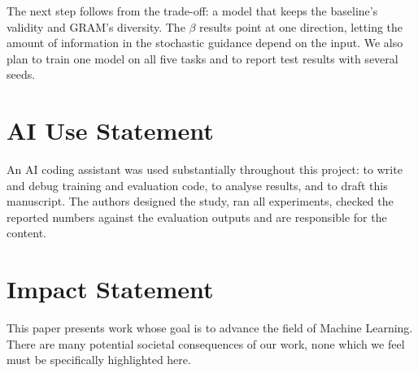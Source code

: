 \documentclass{article}
\begin{document}
The next step follows from the trade-off: a model that keeps the baseline's validity and GRAM's diversity. The
$\beta$ results point at one direction, letting the amount of information in the stochastic guidance depend on the
input. We also plan to train one model on all five tasks and to report test results with several seeds.

\section*{AI Use Statement}

An AI coding assistant was used substantially throughout this project: to write and debug training and evaluation
code, to analyse results, and to draft this manuscript. The authors designed the study, ran all experiments, checked
the reported numbers against the evaluation outputs and are responsible for the content.

\section*{Impact Statement}

This paper presents work whose goal is to advance the field of Machine Learning. There are many potential societal
consequences of our work, none which we feel must be specifically highlighted here.



\end{document}
